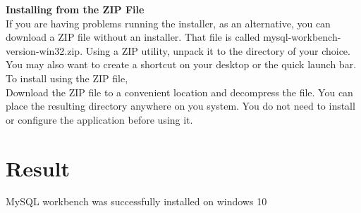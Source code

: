 \documentclass[50pt]{article}
\begin{document}
   \textbf{ Installing from the ZIP File}\\
    If you are having problems running the installer, as an alternative, you can download a ZIP file without an installer. That file is called mysql-workbench-version-win32.zip. Using a ZIP utility, unpack it to the directory of your choice. You may also want to create a shortcut on your desktop or the quick launch bar.
    To install using the ZIP file,\\
     Download the ZIP file to a convenient location and decompress the file. You can place the resulting directory anywhere on you system. You do not need to install or configure the application before using it.
   \section{Result}
   MySQL workbench was successfully installed on windows 10
\end{document}

